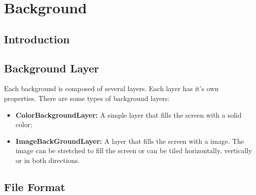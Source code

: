 \chapter{Background}
	\section{Introduction}
	
	\section{Background Layer}
		Each background is composed of several layers. Each layer has it's own properties. There are some types of background layers:
		\begin{itemize}
		\item \textbf{ColorBackgroundLayer: } A simple layer that fills the screen with a solid color;
		\item \textbf{ImageBackGroundLayer: } A layer that fills the screen with a image. The image can be stretched to fill the screen or can be tiled horizontally, vertically or in both directions.
		\end{itemize}
		
	\section{File Format}
	